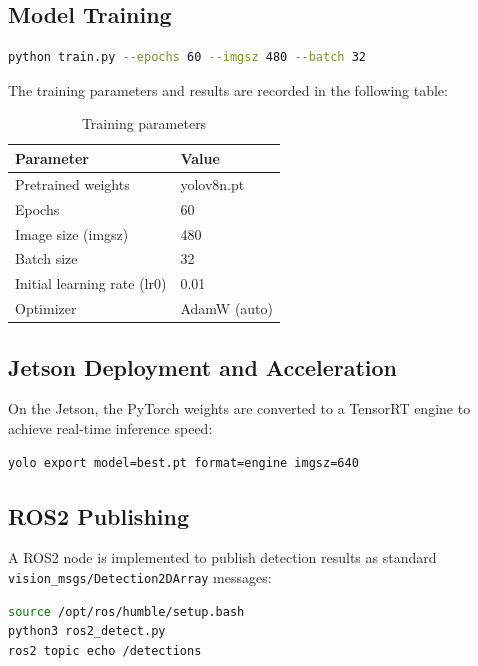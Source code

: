\documentclass[12pt, a4paper]{article}
\begin{document}
\subsection{Model Training}
\begin{lstlisting}[language=bash, caption={Training command}]
python train.py --epochs 60 --imgsz 480 --batch 32
\end{lstlisting}

The training parameters and results are recorded in the following table:

\begin{table}[H]
    \centering
    \begin{tabular}{@{}ll@{}}
        \toprule
        \textbf{Parameter} & \textbf{Value} \\
        \midrule
        Pretrained weights & yolov8n.pt \\
        Epochs & 60 \\
        Image size (imgsz) & 480 \\
        Batch size & 32 \\
        Initial learning rate (lr0) & 0.01 \\
        Optimizer & AdamW (auto) \\
        \bottomrule
    \end{tabular}
    \caption{Training parameters}
\end{table}

\subsection{Jetson Deployment and Acceleration}
On the Jetson, the PyTorch weights are converted to a TensorRT engine to achieve
real-time inference speed:

\begin{lstlisting}[language=bash, caption={Export TensorRT}]
yolo export model=best.pt format=engine imgsz=640
\end{lstlisting}

\subsection{ROS2 Publishing}
A ROS2 node is implemented to publish detection results as standard
\texttt{vision\_msgs/Detection2DArray} messages:

\begin{lstlisting}[language=bash, caption={Run the ROS2 node}]
source /opt/ros/humble/setup.bash
python3 ros2_detect.py
ros2 topic echo /detections
\end{lstlisting}
\end{document}
